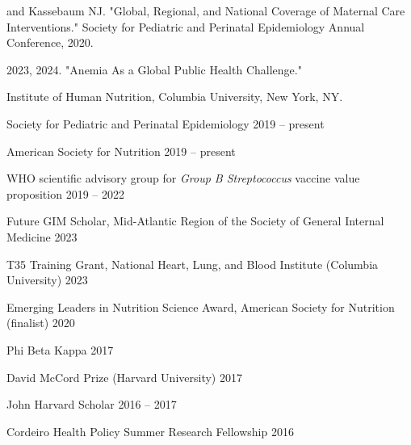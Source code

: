 \documentclass[11pt,article,oneside]{memoir}
\begin{document}
 and Kassebaum NJ. "Global, Regional, and National Coverage of Maternal Care
Interventions." Society for Pediatric and Perinatal Epidemiology Annual Conference, 2020. 

\bigskip 

\medskip

 2023, 2024. "Anemia As a Global Public Health Challenge." 

\indent \indent Institute of Human Nutrition, Columbia University, New York, NY.

\bigskip

\medskip

\ind Society for Pediatric and Perinatal Epidemiology \hfill 2019 -- present

\ind American Society for Nutrition \hfill 2019 -- present

\ind WHO scientific advisory group for \emph{Group B Streptococcus} vaccine value proposition \hfill 2019 -- 2022

\bigskip


\medskip

\ind Future GIM Scholar, Mid-Atlantic Region of the Society of General Internal Medicine \hfill 2023

\ind T35 Training Grant, National Heart, Lung, and Blood Institute (Columbia University) \hfill 2023

\ind Emerging Leaders in Nutrition Science Award, American Society for Nutrition (finalist) \hfill 2020

\ind Phi Beta Kappa \hfill 2017

\ind David McCord Prize (Harvard University) \hfill 2017

\ind John Harvard Scholar \hfill 2016 -- 2017

\ind Cordeiro Health Policy Summer Research Fellowship \hfill 2016

\bigskip
\end{document}
